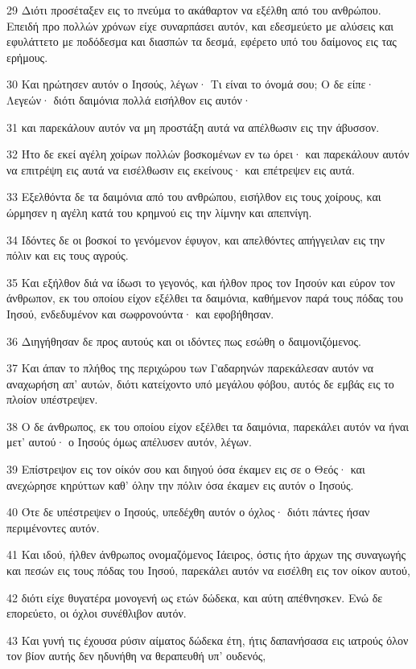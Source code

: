 \par 29 Διότι προσέταξεν εις το πνεύμα το ακάθαρτον να εξέλθη από του ανθρώπου. Επειδή προ πολλών χρόνων είχε συναρπάσει αυτόν, και εδεσμεύετο με αλύσεις και εφυλάττετο με ποδόδεσμα και διασπών τα δεσμά, εφέρετο υπό του δαίμονος εις τας ερήμους.
\par 30 Και ηρώτησεν αυτόν ο Ιησούς, λέγων· Τι είναι το όνομά σου; Ο δε είπε· Λεγεών· διότι δαιμόνια πολλά εισήλθον εις αυτόν·
\par 31 και παρεκάλουν αυτόν να μη προστάξη αυτά να απέλθωσιν εις την άβυσσον.
\par 32 Ήτο δε εκεί αγέλη χοίρων πολλών βοσκομένων εν τω όρει· και παρεκάλουν αυτόν να επιτρέψη εις αυτά να εισέλθωσιν εις εκείνους· και επέτρεψεν εις αυτά.
\par 33 Εξελθόντα δε τα δαιμόνια από του ανθρώπου, εισήλθον εις τους χοίρους, και ώρμησεν η αγέλη κατά του κρημνού εις την λίμνην και απεπνίγη.
\par 34 Ιδόντες δε οι βοσκοί το γενόμενον έφυγον, και απελθόντες απήγγειλαν εις την πόλιν και εις τους αγρούς.
\par 35 Και εξήλθον διά να ίδωσι το γεγονός, και ήλθον προς τον Ιησούν και εύρον τον άνθρωπον, εκ του οποίου είχον εξέλθει τα δαιμόνια, καθήμενον παρά τους πόδας του Ιησού, ενδεδυμένον και σωφρονούντα· και εφοβήθησαν.
\par 36 Διηγήθησαν δε προς αυτούς και οι ιδόντες πως εσώθη ο δαιμονιζόμενος.
\par 37 Και άπαν το πλήθος της περιχώρου των Γαδαρηνών παρεκάλεσαν αυτόν να αναχωρήση απ' αυτών, διότι κατείχοντο υπό μεγάλου φόβου, αυτός δε εμβάς εις το πλοίον υπέστρεψεν.
\par 38 Ο δε άνθρωπος, εκ του οποίου είχον εξέλθει τα δαιμόνια, παρεκάλει αυτόν να ήναι μετ' αυτού· ο Ιησούς όμως απέλυσεν αυτόν, λέγων.
\par 39 Επίστρεψον εις τον οίκόν σου και διηγού όσα έκαμεν εις σε ο Θεός· και ανεχώρησε κηρύττων καθ' όλην την πόλιν όσα έκαμεν εις αυτόν ο Ιησούς.
\par 40 Ότε δε υπέστρεψεν ο Ιησούς, υπεδέχθη αυτόν ο όχλος· διότι πάντες ήσαν περιμένοντες αυτόν.
\par 41 Και ιδού, ήλθεν άνθρωπος ονομαζόμενος Ιάειρος, όστις ήτο άρχων της συναγωγής και πεσών εις τους πόδας του Ιησού, παρεκάλει αυτόν να εισέλθη εις τον οίκον αυτού,
\par 42 διότι είχε θυγατέρα μονογενή ως ετών δώδεκα, και αύτη απέθνησκεν. Ενώ δε επορεύετο, οι όχλοι συνέθλιβον αυτόν.
\par 43 Και γυνή τις έχουσα ρύσιν αίματος δώδεκα έτη, ήτις δαπανήσασα εις ιατρούς όλον τον βίον αυτής δεν ηδυνήθη να θεραπευθή υπ' ουδενός,
